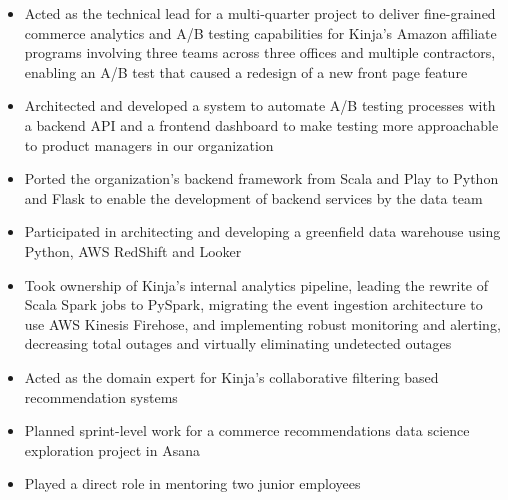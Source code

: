 \begin{itemize}
  \item Acted as the technical lead for a multi-quarter project to deliver
    fine-grained commerce analytics and A/B testing capabilities for Kinja's
    Amazon affiliate programs involving three teams across three offices and
    multiple contractors, enabling an A/B test that caused a redesign of a new
    front page feature
  \item Architected and developed a system to automate A/B testing processes
    with a backend API and a frontend dashboard to make testing more
    approachable to product managers in our organization
  \item Ported the organization's backend framework from Scala and Play to
    Python and Flask to enable the development of backend services by the data
    team
  \item Participated in architecting and developing a greenfield data warehouse
    using Python, AWS RedShift and Looker
  \item Took ownership of Kinja's internal analytics pipeline, leading the
    rewrite of Scala Spark jobs to PySpark, migrating the event ingestion
    architecture to use AWS Kinesis Firehose, and implementing robust monitoring
    and alerting, decreasing total outages and virtually eliminating undetected
    outages
  \item Acted as the domain expert for Kinja's collaborative filtering based
  recommendation systems
  \item Planned sprint-level work for a commerce recommendations data science
  exploration project in Asana
  \item Played a direct role in mentoring two junior employees
\end{itemize}
